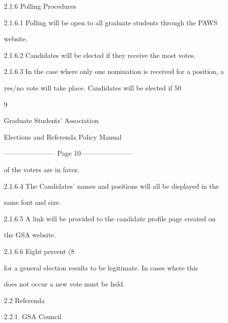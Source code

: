 2.1.6  Polling Procedures  

2.1.6.1        Polling will be open to all graduate students through the PAWS  

               website.   

  

2.1.6.2        Candidates will be elected if they receive the most votes.   

  

2.1.6.3        In the case where only one nomination is received for a position, a  

               yes/no vote will take place. Candidates will be elected if 50%



                                                       9  

                                                                                                                

                                Graduate Students’ Association  

                           Elections and Referenda Policy Manual  

  


----------------------- Page 10-----------------------

                of the voters are in favor.   

  

2.1.6.4         The Candidates’ names and positions will all be displayed in the  

                same font and size.   

  

2.1.6.5         A link will be provided to the candidate profile page created on  

                the GSA website.   

  

2.1.6.6         Eight percent (8%

                for a general election results to be legitimate. In cases where this  

                does not occur a new vote must be held.   

  

                                  

                                2.2       Referenda  

  

2.2.1. GSA Council  


